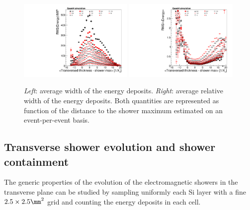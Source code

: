 \begin{figure}[h!]
  \begin{center}
    \includegraphics[width=0.49\textwidth]{figures/version_3_cenunc}
    \includegraphics[width=0.49\textwidth]{figures/version_3_crelunc}
    \caption{{\em Left}: average width of the energy deposits.
    {\em Right}: average relative width of the energy deposits. Both
    quantities are represented as
    function of the distance to the shower maximum estimated on an event-per-event basis.
   }
    \label{fig:longprofilesunc}
  \end{center}
\end{figure}


\subsection{Transverse shower evolution and shower containment}
\label{subsec:transvevol}

The generic properties of the evolution of the electromagnetic showers
in the transverse plane can be studied by sampling uniformly each Si
layer with a fine $2.5\times2.5\mm^2$ grid and counting the energy
deposits in each cell.